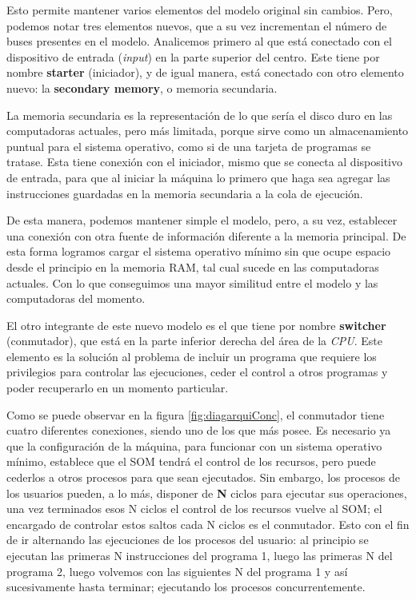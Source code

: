 \documentclass[letterpaper,12pt,oneside]{book}
\begin{document}
		
		Esto permite mantener varios elementos del modelo original sin cambios. Pero, podemos notar tres elementos nuevos, que a su vez
		incrementan el número de buses presentes en el modelo. Analicemos primero al que está conectado con el dispositivo de entrada (\textit{input}) 
		en la parte superior del centro. Este
		tiene por nombre \textbf{starter} (iniciador), y de igual manera, está conectado con otro elemento nuevo: la \textbf{secondary memory}, o 
		memoria secundaria.

  
		La memoria secundaria es la representación de lo que sería el disco duro en las computadoras actuales, pero más limitada, porque sirve 
		como un almacenamiento
		puntual para el sistema operativo, como si de una tarjeta de programas se tratase. Esta
		tiene conexión con el iniciador, mismo que se conecta al dispositivo de entrada, para que al iniciar la máquina lo primero que haga sea agregar 
		las instrucciones guardadas
		en la memoria secundaria a la cola de ejecución.
  
        De esta manera, podemos mantener simple el modelo, pero, a su vez, establecer una conexión
		con otra fuente de información diferente a la memoria principal. De esta forma logramos cargar el sistema operativo mínimo sin que ocupe espacio desde 
		el principio en la memoria RAM, tal cual sucede en las computadoras actuales. Con lo que conseguimos una mayor similitud entre el modelo
		y las computadoras del momento.
		
		
		El otro integrante de este nuevo modelo es el que tiene por nombre \textbf{switcher} (conmutador), que está en la parte inferior derecha del 
		área de la \textit{CPU}.
		Este elemento es la solución al problema de incluir un programa que requiere los privilegios para controlar las ejecuciones,
		ceder el control a otros programas y poder recuperarlo en un momento particular.
  
        Como se puede observar en la figura \ref{fig:diagarquiConc}, el conmutador tiene cuatro diferentes conexiones, siendo uno
		de los que más posee. Es necesario ya que la configuración de la máquina, para funcionar con un sistema operativo mínimo, establece
		que el SOM tendrá el control de los recursos, pero puede cederlos a otros procesos para que sean
		ejecutados. Sin embargo, los procesos de los usuarios pueden, a lo más, disponer de \textbf{N} ciclos para ejecutar sus
		operaciones, una vez terminados esos N ciclos el control de los recursos vuelve al SOM; el encargado de controlar estos saltos cada
		N ciclos es el conmutador. Esto con el fin de ir alternando las ejecuciones de los procesos del usuario: al principio se ejecutan las
		primeras N instrucciones del programa 1, luego las primeras N del programa 2, luego volvemos con las siguientes N del programa
		1 y así sucesivamente hasta terminar; ejecutando los procesos concurrentemente.
		
\end{document}
